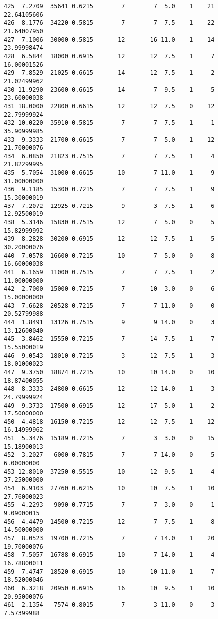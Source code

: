 \documentclass[
  letterpaper,
  DIV=11,
  numbers=noendperiod]{scrreprt}
\begin{document}
\begin{verbatim}
425  7.2709  35641 0.6215        7        7  5.0    1    21 22.64105606
426  8.1776  34220 0.5815        7        7  7.5    1    22 21.64007950
427  7.1006  30000 0.5815       12       16 11.0    1    14 23.99998474
428  6.5844  18000 0.6915       12       12  7.5    1     7 16.00001526
429  7.8529  21025 0.6615       14       12  7.5    1     2 21.02499962
430 11.9290  23600 0.6615       14        7  9.5    1     5 23.60000038
431 18.0000  22800 0.6615       12       12  7.5    0    12 22.79999924
432 10.0220  35910 0.5815        7        7  7.5    1     1 35.90999985
433  9.3333  21700 0.6615        7        7  5.0    1    12 21.70000076
434  6.0850  21823 0.7515        7        7  7.5    1     4 21.82299995
435  5.7054  31000 0.6615       10        7 11.0    1     9 31.00000000
436  9.1185  15300 0.7215        7        7  7.5    1     9 15.30000019
437  7.2072  12925 0.7215        9        3  7.5    1     6 12.92500019
438  5.3146  15830 0.7515       12        7  5.0    0     5 15.82999992
439  8.2828  30200 0.6915       12       12  7.5    1     5 30.20000076
440  7.0578  16600 0.7215       10        7  5.0    0     8 16.60000038
441  6.1659  11000 0.7515        7        7  7.5    1     2 11.00000000
442  2.7000  15000 0.7215        7       10  3.0    0     6 15.00000000
443  7.6628  20528 0.7215        7        7 11.0    0     0 20.52799988
444  1.8491  13126 0.7515        9        9 14.0    0     3 13.12600040
445  3.8462  15550 0.7215        7       14  7.5    1     7 15.55000019
446  9.0543  18010 0.7215        3       12  7.5    1     3 18.01000023
447  9.3750  18874 0.7215       10       10 14.0    0    10 18.87400055
448  8.3333  24800 0.6615       12       12 14.0    1     3 24.79999924
449  9.3733  17500 0.6915       12       17  5.0    1     2 17.50000000
450  4.4818  16150 0.7215       12       12  7.5    1    12 16.14999962
451  5.3476  15189 0.7215        7        3  3.0    0    15 15.18900013
452  3.2027   6000 0.7815        7        7 14.0    0     5  6.00000000
453 12.8010  37250 0.5515       10       12  9.5    1     4 37.25000000
454  6.9103  27760 0.6215       10       10  7.5    1    10 27.76000023
455  4.2293   9090 0.7715        7        7  3.0    0     1  9.09000015
456  4.4479  14500 0.7215       12        7  7.5    1     8 14.50000000
457  8.0523  19700 0.7215        7        7 14.0    1    20 19.70000076
458  7.5057  16788 0.6915       10        7 14.0    1     4 16.78800011
459  7.4747  18520 0.6915       10       10 11.0    1     7 18.52000046
460  6.3218  20950 0.6915       16       10  9.5    1    10 20.95000076
461  2.1354   7574 0.8015        7        3 11.0    0     3  7.57399988

\end{verbatim}
\end{document}
